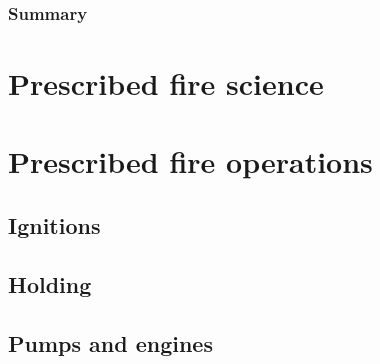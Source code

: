 \documentclass[twoside, 12pt]{tufte-book}
\begin{document}
 
%
%
\begin{titlepage} 
		
	\restoregeometry
\end{titlepage}
%
%
\thispagestyle{empty}
	\begin{mybox}{\section{Summary} \vspace{0.5cm}}
		{\parbox{\textwidth}{ 
			 
		}}
	\end{mybox}
\restoregeometry
%
%

%
% 	
	\tableofcontents
\restoregeometry
%
%
\part{Prescribed fire science}
	
	
	
	


\part{Prescribed fire operations}
	
 \chapter{Ignitions} 
 \chapter{Holding} 
 \chapter{Pumps and engines} 

%
%
\clearpage
\begin{fullwidth} %
 

\end{fullwidth}
%
\end{document}
